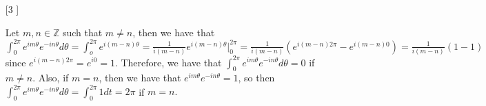 \documentclass{article}
\theoremstyle{definition}
\newcommand{\Z}{\mathbb{Z}}
\begin{document}
\begin{enumerate}
\begin{enumerate}
    \end{enumerate}
    
    \item [[\phantom{-}3]]
    
    Let $m, n\in \Z$ such that $m\neq n$, then we have that $\int_0^{2\pi}e^{im\theta}e^{-in\theta}d\theta = \int_o^{2\pi}e^{i(m-n)\theta} = \frac{1}{i(m-n)}e^{i(m-n)\theta}|_0^{2\pi} = \frac{1}{i(m-n)}(e^{i(m-n)2\pi}-e^{i(m-n)0}) = \frac{1}{i(m-n)}(1-1)$ since $e^{i(m-n)2\pi} = e^{i0} = 1$. Therefore, we have that $\int_0^{2\pi}e^{im\theta}e^{-in\theta}d\theta = 0$ if $m\neq n$. Also, if $m = n$, then we have that $e^{im\theta}e^{-in\theta}=1$, so then $\int_0^{2\pi}e^{im\theta}e^{-in\theta}d\theta = \int_0^{2\pi}1dt = 2\pi$ if $m = n.$
    
\end{enumerate}
\end{document}
